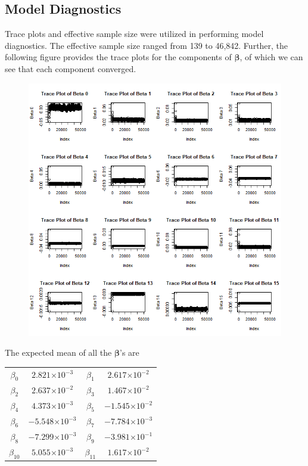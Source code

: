 \documentclass[12pt, onesided]{article}
\providecommand{\e}[1]{\ensuremath{\times 10^{#1}}}
\begin{document}
\begin{flushleft}
\subsection{Model Diagnostics}
Trace plots and effective sample size were utilized in performing model diagnostics. The effective sample size ranged from 139 to 46,842. Further, the following figure provides the trace plots for the components of $\boldsymbol{\beta}$, of which we can see that each component converged. 
\newpage
\begin{figure}[h!]
\centering
\includegraphics[scale=0.5]{Project1_traceplots}
\end{figure}
The expected mean of all the $\mathbf{\beta}$'s are
\begin{center}
\begin{tabular}{cc|cc}
$\beta_0$ & $2.821 \e{-3}$ & $\beta_1$ & $2.617 \e{-2}$ \\
$\beta_2$ & $2.637 \e{-2}$ & $\beta_3$ & $1.467\e{-2}$ \\
$\beta_4$ & $4.373 \e{-3}$ & $\beta_5$ & $-1.545\e{-2}$ \\
$\beta_6$ & $-5.548 \e{-3}$ & $\beta_7$ & $-7.784\e{-3}$ \\
$\beta_8$ & $-7.299 \e{-3}$ & $\beta_9$ & $-3.981\e{-1}$ \\
$\beta_{10}$ & $5.055 \e{-3}$ & $\beta_{11}$ & $1.617\e{-2}$ \\

\end{tabular}
\end{center}
\end{flushleft}
\end{document}
